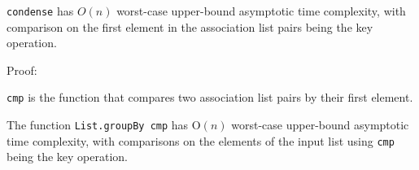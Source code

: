 \documentclass[../main.tex]{subfiles}
\begin{document}
\begin{theorem}
	\texttt{condense} has $O(n)$ worst-case upper-bound asymptotic time complexity, with comparison on the first element in the association list pairs being the key operation.
\end{theorem}

Proof:

\texttt{cmp} is the function that compares two association list pairs by their first element.  










\begin{proposition}
	The function \texttt{List.groupBy cmp} has O$(n)$ worst-case upper-bound asymptotic time complexity, with comparisons on the elements of the input list using \texttt{cmp} being the key operation.
\end{proposition}
\end{document}

